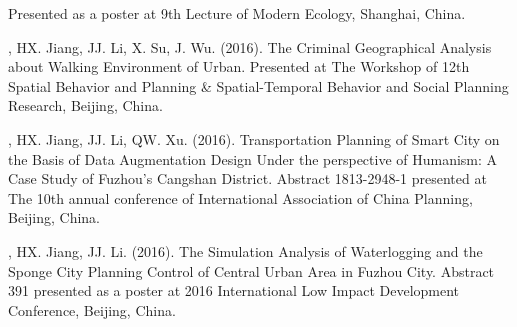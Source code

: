 \begin{etaremune}
    Presented as a poster at 9th Lecture of Modern Ecology, Shanghai, China.
\item
    \Shaoqing, HX. Jiang, JJ. Li, X. Su, J. Wu. (2016).
    The Criminal Geographical Analysis about Walking Environment of Urban.
    Presented at The Workshop of 12th Spatial Behavior and Planning \& Spatial-Temporal Behavior and Social Planning Research, Beijing, China.
\item
    \Shaoqing, HX. Jiang, JJ. Li, QW. Xu. (2016).
    Transportation Planning of Smart City on the Basis of Data Augmentation Design Under the perspective of Humanism: A Case Study of Fuzhou’s Cangshan District.
    Abstract 1813-2948-1 presented at The 10th annual conference of International Association of China Planning, Beijing, China.
\item
    \Shaoqing, HX. Jiang, JJ. Li. (2016).
    The Simulation Analysis of Waterlogging and the Sponge City Planning Control of Central Urban Area in Fuzhou City.
    Abstract 391 presented as a poster at 2016 International Low Impact Development Conference, Beijing, China.
\end{etaremune}

